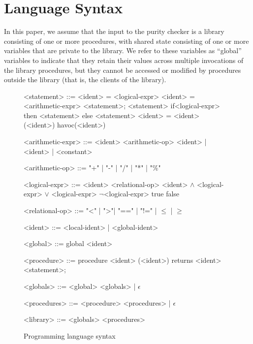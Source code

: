 \section{Language Syntax}
\label{sec:background}

In this paper, we assume that the input to the purity checker is a library consisting
of one or more procedures, with shared state consisting of one or more variables
that are private to the library. We refer to these variables as ``global'' variables to
indicate that they retain their values across multiple invocations of the library
procedures, but they cannot be accessed or modified by procedures outside
the library (that is, the clients of the library).

\begin{figure}[t!]
  \begin{grammar}
    <statement> ::= <ident> = <logical-expr>
    \alt <ident> = <arithmetic-expr>
    \alt <statement>; <statement>
    \alt if<logical-expr> then <statement> else <statement>
    \alt <ident> = <ident> (<ident>)
    \alt havoc(<ident>)


    <arithmetic-expr> ::= <ident> <arithmetic-op> <ident> | <ident> | <constant>

     <arithmetic-op> ::= "+"  |  "-"  |  "/"  |  "*" |  "\%"
 
    <logical-expr> ::= <ident> <relational-op> <ident>
     $\wedge$ <logical-expr>
     $\vee$ <logical-expr>
    \alt $\neg$<logical-expr>
    \alt true
    \alt false

     <relational-op> ::= "<" | ">"| "==" | "!=" | $\leq$ | $\geq$

    <ident> ::= <local-ident> | <global-ident>
 
    <global> ::= global <ident>   

    <procedure> ::= procedure <ident> (<ident>) returns <ident> {<statement>;}

    <globals> ::= <global> <globals> | $\epsilon$

    <procedures> ::= <procedure> <procedures> | $\epsilon$

    <library> ::= <globals> <procedures>
  \end{grammar}
  \caption{Programming language syntax}
  \label{fig:grammar}
\end{figure}

